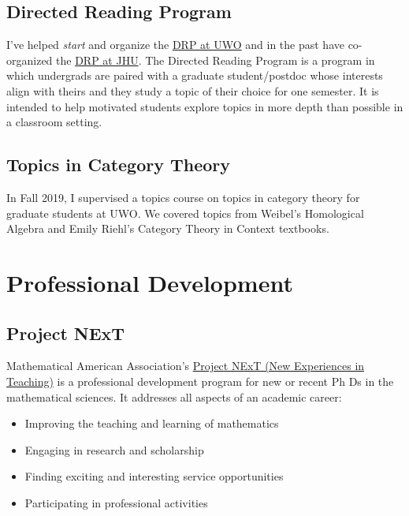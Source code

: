 \documentclass[
]{report}
\providecommand{\tightlist}{%
  \setlength{\itemsep}{0pt}\setlength{\parskip}{0pt}}
\begin{document}
\hypertarget{directed-reading-program}{%
\section{Directed Reading Program}\label{directed-reading-program}}

I've helped \emph{start} and organize the \href{https://www.math.uwo.ca/undergraduate/current_students/directed_reading_program.html}{DRP at
UWO} and in
the past have co-organized the \href{https://math.jhu.edu/drp.html}{DRP at JHU}. The Directed Reading
Program is a program in which undergrads are paired with a graduate student/postdoc whose interests
align with theirs and they study a topic of their choice for one semester. It is intended to help
motivated students explore topics in more depth than possible in a classroom setting.

\hypertarget{topics-in-category-theory}{%
\section{Topics in Category Theory}\label{topics-in-category-theory}}

In Fall 2019, I supervised a topics course on topics in category theory for graduate students at UWO.
We covered topics from Weibel's Homological Algebra and Emily Riehl's Category Theory in Context textbooks.

\hypertarget{professional-development-1}{%
\chapter{Professional Development}\label{professional-development-1}}

\hypertarget{project-next}{%
\section{Project NExT}\label{project-next}}

Mathematical American Association's \href{https://www.maa.org/programs-and-communities/professional-development/project-next}{Project NExT (New Experiences in Teaching)} is a professional development program for new or recent Ph Ds in the mathematical sciences. It addresses all aspects of an academic career:

\begin{itemize}
\tightlist
\item
  Improving the teaching and learning of mathematics
\item
  Engaging in research and scholarship
\item
  Finding exciting and interesting service opportunities
\item
  Participating in professional activities
\end{itemize}
\end{document}
